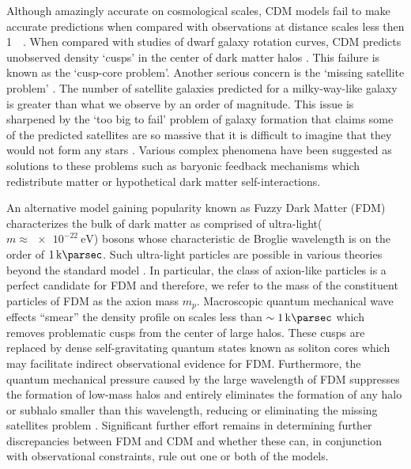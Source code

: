 \documentclass[usenatbib]{mnras}
\newcommand{\squote}[1]{\lq #1\rq}
\newcommand{\poweV}[1]{\SI{e#1}{\electronvolt}}
\begin{document}
\par

Although amazingly accurate on cosmological scales, CDM models fail to make accurate predictions when compared with observations at distance scales less then \SI{1}{\kilo\parsec}. When compared with studies of dwarf galaxy rotation curves, CDM predicts unobserved density \squote{cusps} in the center of dark matter halos \citep{ultralight}. This failure is known as the \squote{cusp-core problem}. Another serious concern is the \squote{missing satellite problem}  \citep{missing_satellites}. The number of satellite galaxies predicted for a milky-way-like galaxy is greater than what we observe by an order of magnitude. This issue is sharpened by the \squote{too big to fail} problem of galaxy formation that claims some of the predicted satellites are so massive that it is difficult to imagine that they would not form any stars \citep{too_big_to_fail}. Various complex phenomena have been suggested as solutions to these problems such as baryonic feedback mechanisms which redistribute matter or  hypothetical dark matter self-interactions.

\par

An alternative model gaining popularity known as Fuzzy Dark Matter (FDM) characterizes the bulk of dark matter as comprised of ultra-light($m \approx \poweV{-22}$) bosons whose characteristic de Broglie wavelength is on the order of $\SI{1}{\kilo\parsec}$. Such ultra-light particles are possible in various theories beyond the standard model \citep{axion_cosmology}. In particular, the class of axion-like particles is a perfect candidate for FDM and therefore, we refer to the mass of the constituent particles of FDM as the axion mass $m_p$. Macroscopic quantum mechanical wave effects “smear” the density profile on scales less than $\sim \SI{1}{\kilo\parsec}$ which removes problematic cusps from the center of large halos. These cusps are replaced by dense self-gravitating quantum states known as soliton cores which may facilitate indirect observational evidence for FDM. Furthermore, the quantum mechanical pressure caused by the large wavelength of FDM suppresses the formation of low-mass halos and entirely eliminates the formation of any halo or subhalo smaller than this wavelength, reducing or eliminating the missing satellites problem \citep{substructure_FDM}. Significant further effort remains in determining further discrepancies between FDM and CDM and whether these can, in conjunction with observational constraints, rule out one or both of the models.
 
\end{document}
